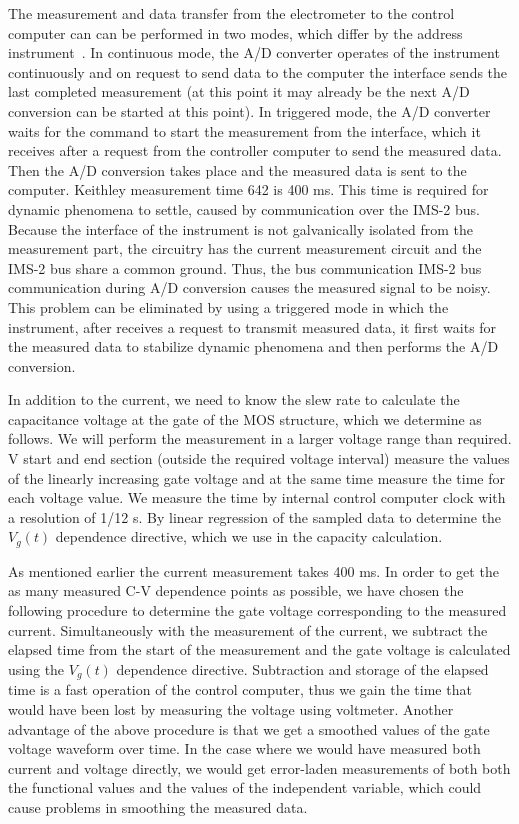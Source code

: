 The measurement and data transfer from the electrometer to the control
computer can can be performed in two modes, which differ by the
address instrument~\cite{5.3}. In continuous mode, the A/D converter
operates of the instrument continuously and on request to send data to
the computer the interface sends the last completed measurement (at
this point it may already be the next A/D conversion can be started at
this point). In triggered mode, the A/D converter waits for the
command to start the measurement from the interface, which it receives
after a request from the controller computer to send the measured
data. Then the A/D conversion takes place and the measured data is
sent to the computer. Keithley measurement time 642 is 400 ms. This
time is required for dynamic phenomena to settle, caused by
communication over the IMS-2 bus. Because the interface of the
instrument is not galvanically isolated from the measurement part, the
circuitry has the current measurement circuit and the IMS-2 bus share
a common ground. Thus, the bus communication IMS-2 bus communication
during A/D conversion causes the measured signal to be noisy.  This
problem can be eliminated by using a triggered mode in which the
instrument, after receives a request to transmit measured data, it
first waits for the measured data to stabilize dynamic phenomena and
then performs the A/D conversion.

In addition to the current, we need to know the slew rate to calculate
the capacitance voltage at the gate of the MOS structure, which we
determine as follows.  We will perform the measurement in a larger
voltage range than required. V start and end section (outside the
required voltage interval) measure the values of the linearly
increasing gate voltage and at the same time measure the time for each
voltage value. We measure the time by internal control computer clock
with a resolution of 1/12 s. By linear regression of the sampled data
to determine the $V_{g}(t)$ dependence directive, which we use in the
capacity calculation.

As mentioned earlier the current measurement takes 400 ms.  In order
to get the as many measured C-V dependence points as possible, we have
chosen the following procedure to determine the gate voltage
corresponding to the measured current. Simultaneously with the
measurement of the current, we subtract the elapsed time from the
start of the measurement and the gate voltage is calculated using the
$V_{g}(t)$ dependence directive. Subtraction and storage of the
elapsed time is a fast operation of the control computer, thus we gain
the time that would have been lost by measuring the voltage using
voltmeter. Another advantage of the above procedure is that we get a
smoothed values of the gate voltage waveform over time. In the case
where we would have measured both current and voltage directly, we
would get error-laden measurements of both both the functional values
and the values of the independent variable, which could cause problems
in smoothing the measured data.

